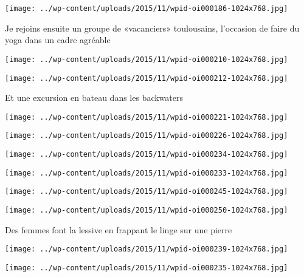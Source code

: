  \newline
\centerline{\texttt{[image: ../wp-content/uploads/2015/11/wpid-oi000186-1024x768.jpg]} } 
 \newline
 Je rejoins ensuite un groupe de «vacanciers» toulousains, l'occasion de faire du yoga dans un cadre agréable \newline
 \newline
\centerline{\texttt{[image: ../wp-content/uploads/2015/11/wpid-oi000210-1024x768.jpg]} } 
 \newline
 \newline
\centerline{\texttt{[image: ../wp-content/uploads/2015/11/wpid-oi000212-1024x768.jpg]} } 
 \newline
 Et une excursion en bateau dans les backwaters \newline
 \newline
\centerline{\texttt{[image: ../wp-content/uploads/2015/11/wpid-oi000221-1024x768.jpg]} } 
 \newline
 \newline
\centerline{\texttt{[image: ../wp-content/uploads/2015/11/wpid-oi000226-1024x768.jpg]} } 
 \newline
 \newline
\centerline{\texttt{[image: ../wp-content/uploads/2015/11/wpid-oi000234-1024x768.jpg]} } 
 \newline
 \newline
\centerline{\texttt{[image: ../wp-content/uploads/2015/11/wpid-oi000233-1024x768.jpg]} } 
 \newline
 \newline
\centerline{\texttt{[image: ../wp-content/uploads/2015/11/wpid-oi000245-1024x768.jpg]} } 
 \newline
 \newline
\centerline{\texttt{[image: ../wp-content/uploads/2015/11/wpid-oi000250-1024x768.jpg]} } 
 \newline
 Des femmes font la lessive en frappant le linge sur une pierre \newline
 \newline
\centerline{\texttt{[image: ../wp-content/uploads/2015/11/wpid-oi000239-1024x768.jpg]} } 
 \newline
 \newline
\centerline{\texttt{[image: ../wp-content/uploads/2015/11/wpid-oi000235-1024x768.jpg]} } 
 \newline
